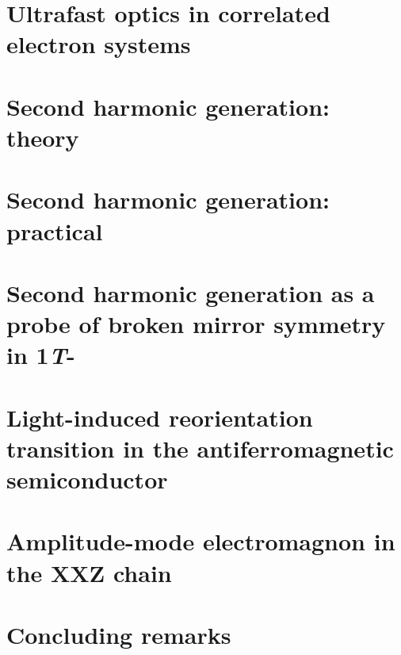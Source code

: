 \documentclass[
    letterpaper,
    12pt,
    openbib,
]{memoir}
\begin{document}
\frontmatter*


\acknowledgements

\clearpage
\preface

\clearpage

\tableofcontents
\clearpage
\listoffigures
\clearpage
\listoftables
\clearpage

\mainmatter*
\chapter{Ultrafast optics in correlated electron systems\label{ch:ch1}}

\chapter{Second harmonic generation: theory\label{ch:ch2}}

\chapter{Second harmonic generation: practical}

\chapter{Second harmonic generation as a probe of broken mirror symmetry in 1\textit{T}-}
\chapter{Light-induced reorientation transition in the antiferromagnetic semiconductor }
\chapter{Amplitude-mode electromagnon in the XXZ chain }
\chapter{Concluding remarks}

\backmatter*

\end{document}
